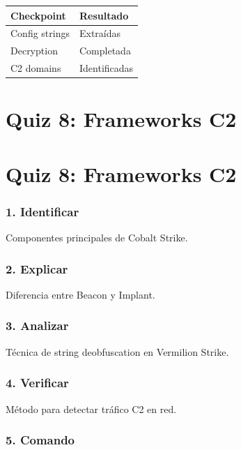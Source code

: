 \documentclass[
  letterpaper,
]{report}
\newcounter{none} %
\begin{document}
{\def\LTcaptype{none} %
\begin{longtable}[]{@{}ll@{}}
\toprule\noalign{}
Checkpoint & Resultado \\
\midrule\noalign{}
\endhead
\bottomrule\noalign{}
\endlastfoot
Config strings & Extraídas \\
Decryption & Completada \\
C2 domains & Identificadas \\
\end{longtable}
}

\chapter{Quiz 8: Frameworks C2}\label{quiz-8-frameworks-c2}

\chapter{Quiz 8: Frameworks C2}\label{quiz-8-frameworks-c2-1}

\subsection{1. Identificar}\label{identificar-3}

Componentes principales de Cobalt Strike.

\subsection{2. Explicar}\label{explicar-3}

Diferencia entre Beacon y Implant.

\subsection{3. Analizar}\label{analizar-1}

Técnica de string deobfuscation en Vermilion Strike.

\subsection{4. Verificar}\label{verificar-1}

Método para detectar tráfico C2 en red.

\subsection{5. Comando}\label{comando-6}
\end{document}
